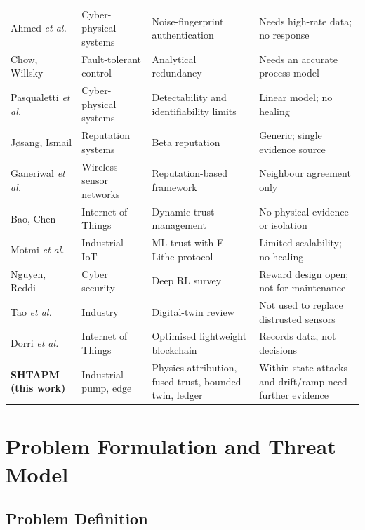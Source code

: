 \documentclass[11pt,a4paper]{article}
\begin{document}
\begin{center}
{\begin{longtable}{@{}P{2.8cm} P{3.3cm} P{3.5cm} P{4.5cm}@{}}
Ahmed \emph{et al.} \cite{ahmed2018noise} & Cyber-physical systems & Noise-fingerprint authentication & Needs high-rate data; no response \\
Chow, Willsky \cite{chow1984redundancy} & Fault-tolerant control & Analytical redundancy & Needs an accurate process model \\
Pasqualetti \emph{et al.} \cite{pasqualetti2013identification} & Cyber-physical systems & Detectability and identifiability limits & Linear model; no healing \\
J{\o}sang, Ismail \cite{josang2002beta} & Reputation systems & Beta reputation & Generic; single evidence source \\
Ganeriwal \emph{et al.} \cite{ganeriwal2008reputation} & Wireless sensor networks & Reputation-based framework & Neighbour agreement only \\
Bao, Chen \cite{bao2012dynamic} & Internet of Things & Dynamic trust management & No physical evidence or isolation \\
Motmi \emph{et al.} \cite{motmi2022elithe} & Industrial IoT & ML trust with E-Lithe protocol & Limited scalability; no healing \\
Nguyen, Reddi \cite{nguyen2023drl} & Cyber security & Deep RL survey & Reward design open; not for maintenance \\
Tao \emph{et al.} \cite{tao2019twin} & Industry & Digital-twin review & Not used to replace distrusted sensors \\
Dorri \emph{et al.} \cite{dorri2017optimized} & Internet of Things & Optimised lightweight blockchain & Records data, not decisions \\
\textbf{SHTAPM (this work)} & Industrial pump, edge & Physics attribution, fused trust, bounded twin, ledger & Within-state attacks and drift/ramp need further evidence \\
\end{longtable}
}
\end{center}

\section{Problem Formulation and Threat Model}
\label{sec:problem}

\subsection{Problem Definition}
\end{document}
